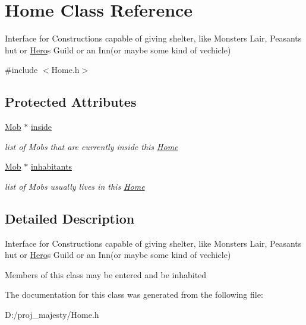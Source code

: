 \hypertarget{class_home}{}\section{Home Class Reference}
\label{class_home}


Interface for Constructions capable of giving shelter, like Monster\textquotesingle{}s Lair, Peasant\textquotesingle{}s hut or \hyperlink{class_hero}{Hero}\textquotesingle{}s Guild or an Inn(or maybe some kind of vechicle)  




{\ttfamily \#include $<$Home.\+h$>$}

\subsection*{Protected Attributes}
\begin{DoxyCompactItemize}
\item 
\hyperlink{class_mob}{Mob} $\ast$ \hyperlink{class_home_a09b567233eb88f856add661dbf49b11f}{inside}\hypertarget{class_home_a09b567233eb88f856add661dbf49b11f}{}\label{class_home_a09b567233eb88f856add661dbf49b11f}

\begin{DoxyCompactList}\small\item\em list of Mobs that are currently inside this \hyperlink{class_home}{Home} \end{DoxyCompactList}\item 
\hyperlink{class_mob}{Mob} $\ast$ \hyperlink{class_home_a04af272e407f5a688d269078ac942b67}{inhabitants}\hypertarget{class_home_a04af272e407f5a688d269078ac942b67}{}\label{class_home_a04af272e407f5a688d269078ac942b67}

\begin{DoxyCompactList}\small\item\em list of Mobs usually lives in this \hyperlink{class_home}{Home} \end{DoxyCompactList}\end{DoxyCompactItemize}


\subsection{Detailed Description}
Interface for Constructions capable of giving shelter, like Monster\textquotesingle{}s Lair, Peasant\textquotesingle{}s hut or \hyperlink{class_hero}{Hero}\textquotesingle{}s Guild or an Inn(or maybe some kind of vechicle) 

Members of this class may be entered and be inhabited 

The documentation for this class was generated from the following file\+:\begin{DoxyCompactItemize}
\item 
D\+:/proj\+\_\+majesty/Home.\+h\end{DoxyCompactItemize}
